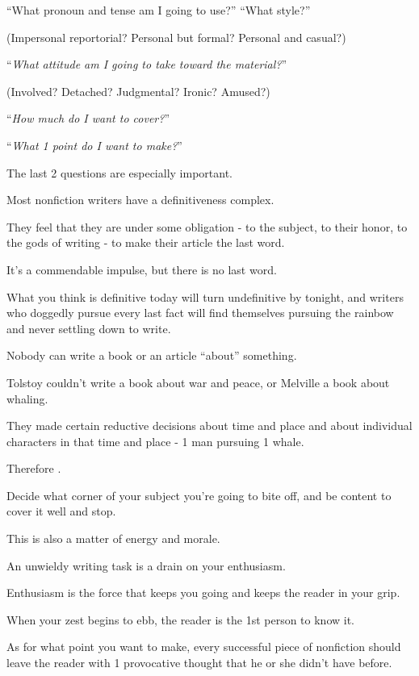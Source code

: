 \documentclass{book}
\numberwithin{equation}{section}
\begin{document}
``What pronoun and tense am I going to use?'' ``What style?''

(Impersonal reportorial? Personal but formal? Personal and casual?)

``\textit{What attitude am I going to take toward the material?}''

(Involved? Detached? Judgmental? Ironic? Amused?)

``\textit{How much do I want to cover?}''

``\textit{What 1 point do I want to make?}''

%
The last 2 questions are especially important.

Most nonfiction writers have a definitiveness complex.

They feel that they are under some obligation - to the subject, to their honor, to the gods of writing - to make their article the last word.

It's a commendable impulse, but there is no last word.

What you think is definitive today will turn undefinitive by tonight, and writers who doggedly pursue every last fact will find themselves pursuing the rainbow and never settling down to write.

Nobody can write a book or an article ``about'' something.

Tolstoy couldn't write a book about war and peace, or Melville a book about whaling.

They made certain reductive decisions about time and place and about individual characters in that time and place - 1 man pursuing 1 whale.


Therefore .

Decide what corner of your subject you're going to bite off, and be content to cover it well and stop.

This is also a matter of energy and morale.

An unwieldy writing task is a drain on your enthusiasm.

Enthusiasm is the force that keeps you going and keeps the reader in your grip.

When your zest begins to ebb, the reader is the 1st person to know it.

%
As for what point you want to make, every successful piece of nonfiction should leave the reader with 1 provocative thought that he or she didn't have before.
\end{document}
